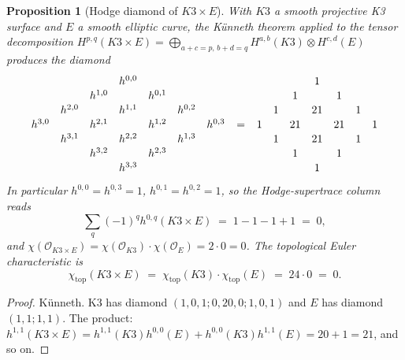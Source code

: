 \documentclass[11pt]{article}
\newtheorem{proposition}[theorem]{Proposition}
\providecommand{\cO}{\mathcal{O}}
\begin{document}
\begin{proposition}[Hodge diamond of $K3 \times E$]
\label{prop:hodge-diamond-k3e}
With $K3$ a smooth projective K3 surface and $E$ a smooth elliptic
curve, the K\"unneth theorem applied to the tensor decomposition
$H^{p,q}(K3 \times E) = \bigoplus_{a+c = p,\, b+d = q}
H^{a,b}(K3) \otimes H^{c,d}(E)$ produces the diamond
\[
\renewcommand{\arraystretch}{1.1}
\begin{array}{ccccccc}
& & & h^{0,0} & & & \\
& & h^{1,0} & & h^{0,1} & & \\
& h^{2,0} & & h^{1,1} & & h^{0,2} & \\
h^{3,0} & & h^{2,1} & & h^{1,2} & & h^{0,3} \\
& h^{3,1} & & h^{2,2} & & h^{1,3} & \\
& & h^{3,2} & & h^{2,3} & & \\
& & & h^{3,3} & & &
\end{array}
\;=\;
\renewcommand{\arraystretch}{1.1}
\begin{array}{ccccccc}
& & & 1 & & & \\
& & 1 & & 1 & & \\
& 1 & & 21 & & 1 & \\
1 & & 21 & & 21 & & 1 \\
& 1 & & 21 & & 1 & \\
& & 1 & & 1 & & \\
& & & 1 & & &
\end{array}
\]
In particular $h^{0,0} = h^{0,3} = 1$, $h^{0,1} = h^{0,2} = 1$, so the
Hodge-supertrace column reads
\[
  \sum_q (-1)^q h^{0,q}(K3 \times E)
  \;=\; 1 - 1 - 1 + 1 \;=\; 0,
\]
and $\chi(\cO_{K3 \times E}) = \chi(\cO_{K3}) \cdot \chi(\cO_E) = 2 \cdot 0 = 0$.
The topological Euler characteristic is
\[
  \chi_{\mathrm{top}}(K3 \times E) \;=\; \chi_{\mathrm{top}}(K3) \cdot
  \chi_{\mathrm{top}}(E) \;=\; 24 \cdot 0 \;=\; 0.
\]
\end{proposition}

\begin{proof}
K\"unneth. K3 has diamond $(1, 0, 1; 0, 20, 0; 1, 0, 1)$ and $E$ has
diamond $(1, 1; 1, 1)$. The product: $h^{1,1}(K3 \times E) =
h^{1,1}(K3) h^{0,0}(E) + h^{0,0}(K3) h^{1,1}(E) = 20 + 1 = 21$, and so on.
\end{proof}
\end{document}
